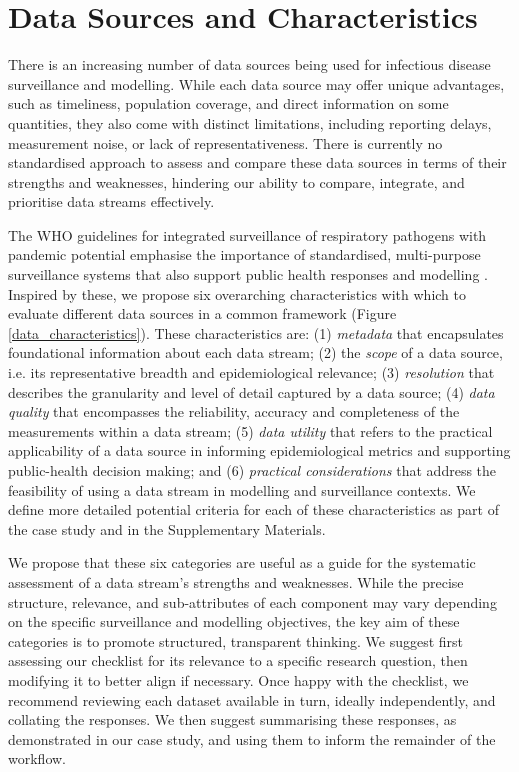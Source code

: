 \documentclass{article}
\begin{document}
\section{Data Sources and Characteristics} \label{sec:datareview}

There is an increasing number of data sources being used for infectious disease surveillance and modelling. While each data source may offer unique advantages, such as timeliness, population coverage, and direct information on some quantities, they also come with distinct limitations, including reporting delays,  measurement noise, or lack of representativeness. There is currently no standardised approach to assess and compare these data sources in terms of their strengths and weaknesses, hindering our ability to compare, integrate, and prioritise data streams effectively. 

The WHO guidelines for integrated surveillance of respiratory pathogens with pandemic potential emphasise the importance of standardised, multi-purpose surveillance systems that also support public health responses and modelling \citep{world2024implementing}. Inspired by these, we propose six overarching characteristics with which to evaluate different data sources in a common framework (Figure \ref{data_characteristics}).  These characteristics are: (1) \textit{metadata}  that encapsulates foundational information about each data stream; (2) the \textit{scope} of a data source, i.e. its representative breadth and epidemiological relevance; (3) \textit{resolution} that describes the granularity and level of detail captured by a data source; (4) \textit{data quality} that encompasses the reliability, accuracy and completeness of the measurements within a data stream; (5) \textit{data utility} that refers to the practical applicability of a data source in informing epidemiological metrics and supporting public-health decision making; and (6)\textit{ practical considerations} that address the feasibility of using a data stream in modelling and surveillance contexts. We define more detailed potential criteria for each of these characteristics as part of the case study and in the Supplementary Materials. 

We propose that these six categories are useful as a guide for the systematic assessment of a data stream's strengths and weaknesses. While the precise structure, relevance, and sub-attributes of each component may vary depending on the specific surveillance and modelling objectives, the key aim of these categories is to promote structured, transparent thinking. We suggest first assessing our checklist for its relevance to a specific research question, then modifying it to better align if necessary. Once happy with the checklist, we recommend reviewing each dataset available in turn, ideally independently, and collating the responses. We then suggest summarising these responses, as demonstrated in our case study, and using them to inform the remainder of the workflow.
\end{document}
